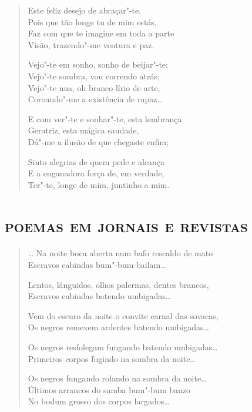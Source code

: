 {\begin{verse}
Este feliz desejo de abraçar"-te,\\
Pois que tão longe tu de mim estás,\\
Faz com que te imagine em toda a parte\\
Visão, trazendo"-me ventura e paz.

Vejo"-te em sonho, sonho de beijar"-te;\\
Vejo"-te sombra, vou correndo atrás;\\
Vejo"-te nua, oh branco lírio de arte,\\
Coroando"-me a existência de rapaz\ldots{}

E com ver"-te e sonhar"-te, esta lembrança\\
Geratriz, esta mágica saudade,\\
Dá"-me a ilusão de que chegaste enfim;

Sinto alegrias de quem pede e alcança\\
E a enganadora força de, em verdade,\\
Ter"-te, longe de mim, juntinho a mim.
\end{verse}

\paginabranca
{}
\part*{\textsc{poemas em jornais e revistas}}



\begin{verse}
\ldots{} Na noite boca aberta num bafo rescaldo de mato\\
Escravos cabindas bum"-bum bailam\ldots{}

Lentos, lânguidos, olhos palermas, dentes brancos,\\
Escravos cabindas batendo umbigadas\ldots{}

Vem do escuro da noite o convite carnal das sovacas,\\
Os negros remexem ardentes batendo umbigadas\ldots{}

Os negros resfolegam fungando batendo umbigadas\ldots{}\\
Primeiros corpos fugindo na sombra da noite\ldots{}

Os negros fungando rolando na sombra da noite\ldots{}\\
Últimos arrancos do samba bum"-bum banzo\\
No bodum grosso dos corpos largados\ldots{}
\end{verse}

}
